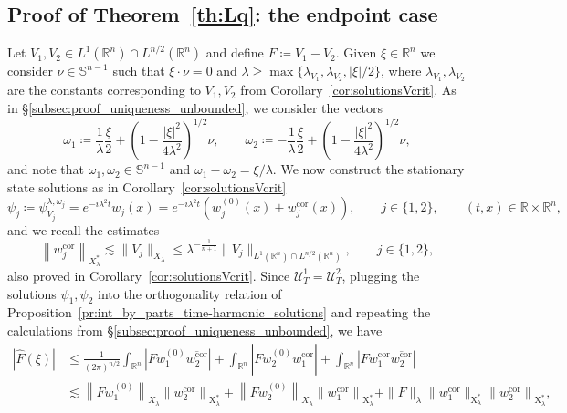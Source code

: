 \documentclass[11pt,a4paper]{amsart}
\theoremstyle{remark}
\theoremstyle{definition}
\newcommand{\R}{\mathbb{R}}
\newcommand{\Sph}{\mathbb{S}}
\newcommand{\X}{\mathrm{X}}
\def\wh{\widehat}
\begin{document}
\subsection{Proof of Theorem~\ref{th:Lq}: the endpoint case}\label{subsec: proof_uniqueness_endpoint} Let $V_1,V_2\in L^1(\R^n)\cap L^{n/2}(\R^n)$ and define $F\coloneqq V_1 - V_2$. Given $\xi \in \R^n$ we consider $\nu \in \Sph^{n-1}$ such that $\xi \cdot \nu = 0$ and $\lambda \geq \max\{\lambda_{V_1},\lambda_{V_2},|\xi|/2\}$, where $\lambda_{V_1},\lambda_{V_2}$ are the constants corresponding to $V_1,V_2$ from Corollary~\ref{cor:solutionsVcrit}. As in \S\ref{subsec:proof_uniqueness_unbounded}, we consider the vectors
\[
\omega_1 \coloneqq \frac{1}{\lambda} \frac{\xi}{2} + \left( 1 - \frac{|\xi|^2}{4 \lambda^2} \right)^{1/2} \nu,\qquad \omega_2 \coloneqq -\frac{1}{\lambda} \frac{\xi}{2} + \left( 1 - \frac{|\xi|^2}{4 \lambda^2} \right)^{1/2} \nu,
\]
and note that $\omega_1,\omega_2\in\mathbb S^{n-1}$ and $\omega_1 - \omega_2 = \xi/\lambda$.  
We now construct the stationary state solutions as in Corollary~\ref{cor:solutionsVcrit}
\[
\psi_j\coloneqq \psi_{V_j} ^{\lambda,\omega_j}=e^{-i\lambda^2t}w_j(x)=e^{-i\lambda^2t}\left(w^{(0)}_j(x)+w^{\mathrm{cor}}_j(x)\right),\qquad j\in\{1,2\},\qquad (t,x)\in\R\times \R^n,
\]
and we recall the estimates
\begin{equation}\label{eq:psiestimates}
\left\|w^{\mathrm{cor}}_j\right\|_{X_\lambda ^*}\lesssim \|V_j\|_{X_\lambda}\leq \lambda^{-\frac{1}{n+1}} \|V_j\|_{L^1(\R^n)\cap L^{n/2}(\R^n)},\qquad j\in\{1,2\},
\end{equation}
also proved in Corollary~\ref{cor:solutionsVcrit}. Since $ \mathcal{U}^1_T=\mathcal{U}^2_T$, plugging the solutions $\psi_1,\psi_2$ into the orthogonality relation of 
Proposition~\ref{pr:int_by_parts_time-harmonic_solutions} and repeating the calculations from \S\ref{subsec:proof_uniqueness_unbounded}, we have 
\[
\begin{split}
|\wh{F}(\xi)| &\leq \frac{1}{(2\pi)^{n/2}} \int_{\R^n} \left|F w^{(0)}_1 \overline{w^{\mathrm{cor}}_2}\right| + \int_{\R^n} \left|F \overline{w^{(0)}_2} w^{\mathrm{cor}}_1\right| + \int_{\R^n} \left|F w^{\mathrm{cor}}_1 \overline{w^{\mathrm{cor}}_2}\right| 
\\
&\lesssim \left\|Fw^{(0)}_1\right\|_{X_\lambda} \left\|w^{\mathrm{cor}}_2\right\|_{\X_\lambda ^*}+\left\|Fw^{(0)}_2\right\|_{X_\lambda} \left\|w^{\mathrm{cor}}_1\right\|_{\X_\lambda ^*}+\|F\|_\lambda\|w^{\mathrm{cor}}_1\|_{\X_\lambda ^*} \left \|w^{\mathrm{cor}}_2\right \|_{\X_\lambda ^*},
\end{split}
\]
\end{document}
